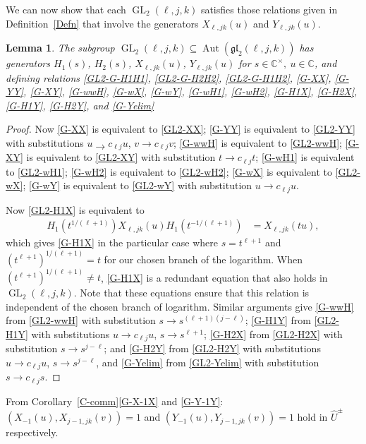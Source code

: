 \documentclass[11pt,letterpaper]{amsart}
\newcounter{thecounter}
\numberwithin{thecounter}{section}
\newtheorem{lemma}[thecounter]{Lemma}
\theoremstyle{definition}
\DeclareMathOperator{\GL}{GL}
\DeclareMathOperator{\Aut}{Aut}
\newcommand{\C}{{\mathbb C}}
\newcommand{\Uhpm}{{\widehat{U}^\pm}}
\begin{document}
We can now show that each $\GL_2(\ell,j,k)$ satisfies those relations given in Definition~\ref{Defn} that  involve the generators $X_{\ell,jk}(u)$ and  $Y_{\ell,jk}(u)$.
\begin{lemma}\label{L-GL2ljk}
The subgroup $\GL_2({\ell,j,k})\subseteq\Aut(\mathfrak{gl}_2(\ell,j,k))$ has generators
$H_1(s)$, $H_2(s)$, $X_{\ell,jk}(u)$,  $Y_{\ell,jk}(u)$ for  $s\in\C^\times,\ u\in\C $,
and defining relations \eqref{GL2-G-H1H1}, \eqref{GL2-G-H2H2}, \eqref{GL2-G-H1H2}, \eqref{G-XX}, 
\eqref{G-YY}, \eqref{G-XY}, \eqref{G-wwH}, \eqref{G-wX}, \eqref{G-wY}, \eqref{G-wH1},  
\eqref{G-wH2}, \eqref{G-H1X}, \eqref{G-H2X}, \eqref{G-H1Y}, \eqref{G-H2Y}, and \eqref{G-Yelim}
\end{lemma}
\begin{proof}
Now \eqref{G-XX} is equivalent to \eqref{GL2-XX}; 
\eqref{G-YY} is equivalent to \eqref{GL2-YY} with substitutions $u\to c_{\ell j} u$, $v\to c_{\ell j} v$;
\eqref{G-wwH} is equivalent to \eqref{GL2-wwH};
\eqref{G-XY} is equivalent to \eqref{GL2-XY} with substitution $t\to c_{\ell j} t$;
\eqref{G-wH1} is equivalent to \eqref{GL2-wH1};
\eqref{G-wH2} is equivalent to \eqref{GL2-wH2};
 \eqref{G-wX} is equivalent to \eqref{GL2-wX};
 \eqref{G-wY} is equivalent to \eqref{GL2-wY} with substitution $u\to c_{\ell j} u$.
 
Now
\eqref{GL2-H1X}  is equivalent to
\begin{align*}
{H}_1\left(t^{1/(\ell+1)} \right)X_{\ell,jk}\left(u \right){H}_1\left(t^{-1/(\ell+1)} \right)&=X_{\ell,jk}(tu),
\end{align*}
which gives \eqref{G-H1X} in the particular case where $s=t^{\ell+1}$ and $\left(t^{\ell+1} \right)^{1/(\ell+1)}=t$ for our chosen branch of the logarithm.
When $\left(t^{\ell+1} \right)^{1/(\ell+1)}\ne t$,  \eqref{G-H1X} is a redundant equation that also holds in  $\GL_2({\ell,j,k})$.
Note that these equations ensure that this relation is independent of the chosen  branch of logarithm.
Similar arguments give
\eqref{G-wwH} from \eqref{GL2-wwH} with substitution $s\to s^{(\ell+1)(j-\ell)}$;
\eqref{G-H1Y} from \eqref{GL2-H1Y} with substitutions $u\to c_{\ell j} u$, $s\to s^{\ell+1}$;
\eqref{G-H2X} from \eqref{GL2-H2X}  with substitution $s\to s^{j-\ell}$; and
\eqref{G-H2Y} from \eqref{GL2-H2Y} with substitutions $u\to c_{\ell j} u$, $s\to s^{j-\ell}$, and \eqref{G-Yelim} from \eqref{GL2-Yelim} with substitution $s\to c_{\ell j}s$.
\end{proof}


From Corollary~\ref{C-comm}\eqref{G-X-1X} and \eqref{G-Y-1Y}:
 $\left(X_{-1}(u),X_{j-1,jk}(v)\right) =1$ and $\left(Y_{-1}(u),Y_{j-1,jk}(v)\right) = 1$ hold in $\Uhpm$ respectively.
\end{document}
